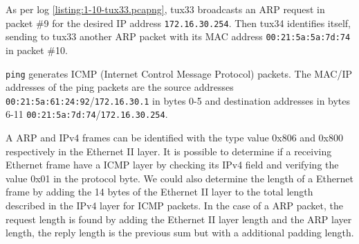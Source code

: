 \documentclass[a4paper, 11pt]{report}
\begin{document}
As per log \ref{listing:1-10-tux33.pcapng}, tux33 broadcasts an ARP request in packet \#9 for the desired IP address \texttt{172.16.30.254}.
Then tux34 identifies itself, sending to tux33 another ARP packet with its MAC address \texttt{00:21:5a:5a:7d:74} in packet \#10.

\texttt{ping} generates ICMP (Internet Control Message Protocol) packets. The MAC/IP addresses of the ping packets are the source addresses \texttt{00:21:5a:61:24:92}/\texttt{172.16.30.1} in bytes 0-5
and destination addresses in bytes 6-11 \texttt{00:21:5a:7d:74}/\texttt{172.16.30.254}.

A ARP and IPv4 frames can be identified with the type value 0x806 and 0x800 respectively in the Ethernet II layer.
It is possible to determine if a receiving Ethernet frame have a ICMP layer by checking its IPv4 field and verifying the value 0x01 in the protocol byte.
We could also determine the length of a Ethernet frame by adding the 14 bytes of the Ethernet II layer to the total length described in the IPv4 layer for ICMP packets.
In the case of a ARP packet, the request length is found by adding the Ethernet II layer length and the ARP layer length, the reply length is the previous sum but with a additional padding length. 
\end{document}
